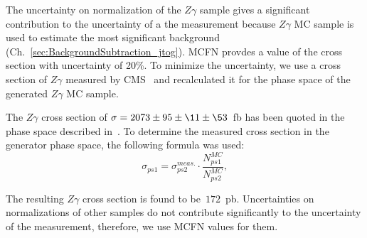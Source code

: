 The uncertainty on normalization of the $Z\gamma$ sample gives a significant contribution to the uncertainty of a the measurement because $Z\gamma$ MC sample is used to estimate the most significant background (Ch.~\ref{sec:BackgroundSubtraction_jtog}). MCFN provdes a value of the cross section with uncertainty of 20\%. To minimize the uncertainty, we use a cross section of $Z\gamma$ measured by CMS~\cite{ref_Zg8TeV} and recalculated it for the phase space of the generated $Z\gamma$ MC sample. 

The $Z\gamma$ cross section of $\sigma = 2073 \pm 95 \pm \11 \pm \53$~fb has been quoted in the phase space described in~\cite{Zg8TeV}. To determine the measured cross section in the generator phase space, the following formula was used:
\begin{equation}
\sigma_{ps1} = \sigma_{ps2}^{meas.} \cdot \frac{N_{ps1}^{MC}}{N_{ps2}^{MC}},
\end{equation}

The resulting $Z\gamma$ cross section is found to be~$172$~pb. Uncertainties on normalizations of other samples do not contribute significantly to the uncertainty of the measurement, therefore, we use MCFN values for them.


